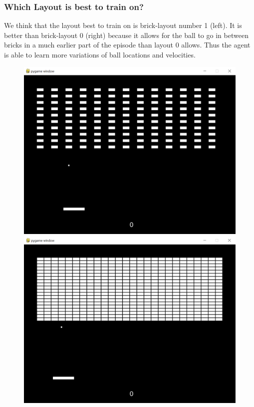 \documentclass[twoside,11pt]{article}
\begin{document}
\subsubsection{Which Layout is best to train on?}
We think that the layout best to train on is brick-layout number 1 (left). It is better than brick-layout 0 (right) because it allows for the ball to go in between bricks in a much earlier part of the episode than layout 0 allows. Thus the agent is able to learn more variations of ball locations and velocities.
\begin{figure}[H]
\includegraphics[scale=0.3]{bricklayout1}
\includegraphics[scale=0.3]{bricklayout0}
\centering
\end{figure}
\end{document}
